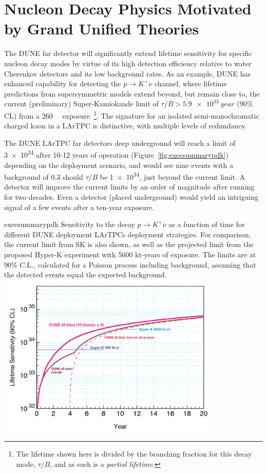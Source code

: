 \section{Nucleon Decay Physics Motivated by Grand Unified Theories}


The DUNE far detector will significantly extend lifetime sensitivity
for specific nucleon decay modes by virtue of its high detection
efficiency relative to water Cherenkov detectors and its low
background rates.  As an example, DUNE has enhanced capability for
detecting the $p\to K^+\overline{\nu}$ channel, where lifetime
predictions from supersymmetric models extend beyond, but remain close
to, the current (preliminary) Super-Kamiokande limit of $\tau/B >
\SI{5.9e33}{year}$ (90\% CL) from a \SI[number-unit-product = -,
inter-unit-product=\ensuremath{{}\cdot{}}]{260}{\kt\year}
exposure~\cite{kearns_isoups}\footnote{The lifetime shown here is
  divided by the branching fraction for this decay mode, $\tau/B$, and
  as such is a \emph{partial lifetime}.}.  The signature for an
isolated semi-monochromatic charged kaon in a LArTPC is distinctive,
with multiple levels of redundancy.  

The DUNE LArTPC far detectors deep underground will reach a limit of
\SI{3e34}{\year} after 10-12 years of operation
(Figure~\ref{fig:execsummarypdk}) depending on the deployment
scenario, and would see nine events with a background of 0.3 should
$\tau/B$ be \SI{1e34}{\year}, just beyond the current limit. A 
detector will improve the current limits by an order of magnitude
after running for two decades. Even a  detector (placed
underground) would yield an intriguing signal of a few events after a
ten-year exposure.

\begin{cdrfigure}{execsummarypdk} {Sensitivity to the
    decay $p\to K^+ \overline{\nu}$ as a function of time for different DUNE 
deployment  LArTPCs deployment strategies. 
  For comparison, the current limit from SK is also shown, as well as the projected limit from the proposed Hyper-K experiment with 5600 kt-years of exposure.
  The limits are at 90\% C.L., calculated for
  a Poisson process including background, assuming that the detected events
  equal the expected background.}
\includegraphics[width=0.8\textwidth]{volume-physics/figures/lar4x10.png}
\end{cdrfigure}

